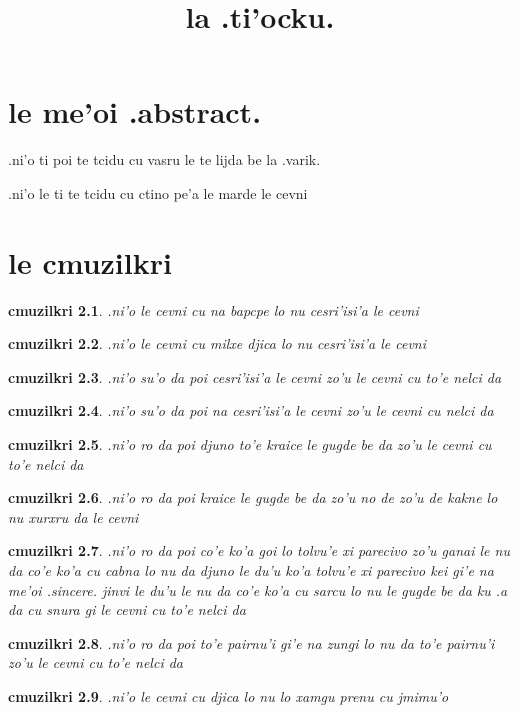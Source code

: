 \documentclass{report}
\title{la .ti'ocku.}
\newtheorem{cmuzilkri}{cmuzilkri}
\begin{document}
\maketitle
\chapter{le me'oi .abstract.}
.ni'o ti poi te tcidu cu vasru le te lijda be la .varik.

.ni'o le ti te tcidu cu ctino pe'a le marde le cevni

\chapter{le cmuzilkri}
\begin{cmuzilkri}
	.ni'o le cevni cu na bapcpe lo nu cesri'isi'a le cevni
\end{cmuzilkri}
\begin{cmuzilkri}
	.ni'o le cevni cu milxe djica lo nu cesri'isi'a le cevni
\end{cmuzilkri}
\begin{cmuzilkri}
        .ni'o su'o da poi cesri'isi'a le cevni zo'u le cevni cu to'e nelci da
\end{cmuzilkri}
\begin{cmuzilkri}
        .ni'o su'o da poi na cesri'isi'a le cevni zo'u le cevni cu nelci da
\end{cmuzilkri}
\begin{cmuzilkri}
	.ni'o ro da poi djuno to'e kraice le gugde be da zo'u le cevni cu to'e nelci da
\end{cmuzilkri}
\begin{cmuzilkri}
        .ni'o ro da poi kraice le gugde be da zo'u no de zo'u de kakne lo nu xurxru da le cevni
\end{cmuzilkri}
\begin{cmuzilkri}
        .ni'o ro da poi co'e ko'a goi lo tolvu'e xi parecivo zo'u ganai le nu da co'e ko'a cu cabna lo nu da djuno le du'u ko'a tolvu'e xi parecivo kei gi'e na me'oi .sincere. jinvi le du'u le nu da co'e ko'a cu sarcu lo nu le gugde be da ku .a da cu snura gi le cevni cu to'e nelci da
\end{cmuzilkri}
\begin{cmuzilkri}
	.ni'o ro da poi to'e pairnu'i gi'e na zungi lo nu da to'e pairnu'i zo'u le cevni cu to'e nelci da
\end{cmuzilkri}
\begin{cmuzilkri}
	.ni'o le cevni cu djica lo nu lo xamgu prenu cu jmimu'o
\end{cmuzilkri}
\end{document}
